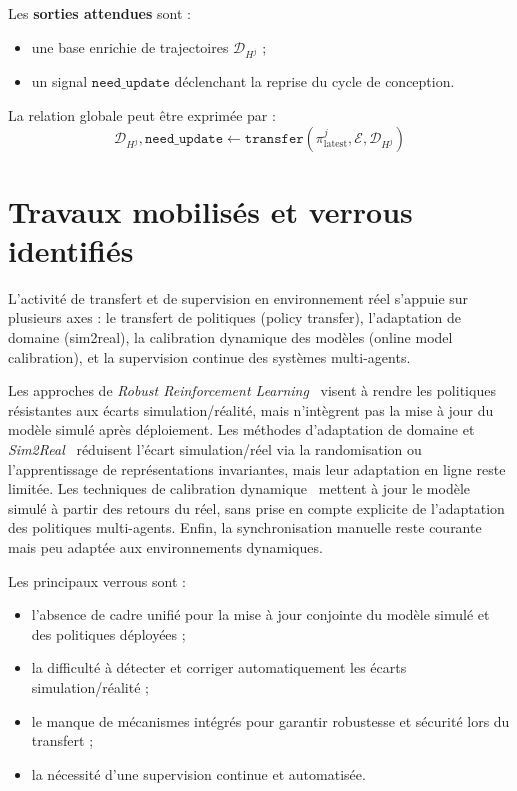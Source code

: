 Les \textbf{sorties attendues} sont :
\begin{itemize}
    \item une base enrichie de trajectoires $\mathcal{D}_{H^j}$ ;
    \item un signal $\texttt{need\_update}$ déclenchant la reprise du cycle de conception.
\end{itemize}

La relation globale peut être exprimée par :
\[
    \mathcal{D}_{H^j}, \texttt{need\_update} \gets \texttt{transfer}(\pi^j_{\text{latest}}, \mathcal{E}, \mathcal{D}_{H^j})
\]

\section{Travaux mobilisés et verrous identifiés}

L’activité de transfert et de supervision en environnement réel s’appuie sur plusieurs axes : le transfert de politiques (policy transfer), l’adaptation de domaine (sim2real), la calibration dynamique des modèles (online model calibration), et la supervision continue des systèmes multi-agents.

Les approches de \textit{Robust Reinforcement Learning}~\cite{pinto2017robust} visent à rendre les politiques résistantes aux écarts simulation/réalité, mais n’intègrent pas la mise à jour du modèle simulé après déploiement. Les méthodes d’adaptation de domaine et \textit{Sim2Real}~\cite{tobin2017domain,ganin2016domain} réduisent l’écart simulation/réel via la randomisation ou l’apprentissage de représentations invariantes, mais leur adaptation en ligne reste limitée. Les techniques de calibration dynamique~\cite{deisenroth2011pilco} mettent à jour le modèle simulé à partir des retours du réel, sans prise en compte explicite de l’adaptation des politiques multi-agents. Enfin, la synchronisation manuelle reste courante mais peu adaptée aux environnements dynamiques.

Les principaux verrous sont :
\begin{itemize}
    \item l’absence de cadre unifié pour la mise à jour conjointe du modèle simulé et des politiques déployées ;
    \item la difficulté à détecter et corriger automatiquement les écarts simulation/réalité ;
    \item le manque de mécanismes intégrés pour garantir robustesse et sécurité lors du transfert ;
    \item la nécessité d’une supervision continue et automatisée.
\end{itemize}

